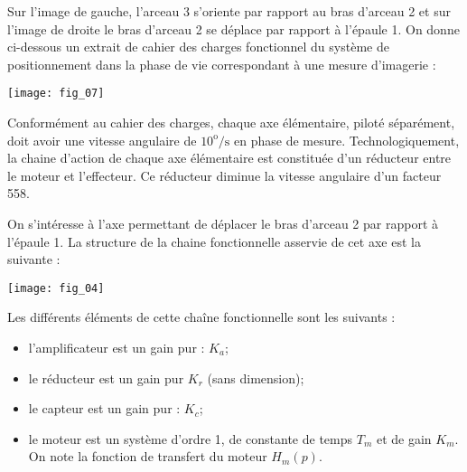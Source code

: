 Sur l’image de gauche, l’arceau 3 s’oriente par rapport au bras d’arceau 2 et sur l’image de droite le bras d’arceau 2 se déplace par rapport à l’épaule 1. On donne ci-dessous un extrait de cahier des charges fonctionnel du système de positionnement dans la phase de vie correspondant à une mesure d'imagerie : 

\begin{center}
\texttt{[image: fig\_07]}
\end{center}

%

Conformément au cahier des charges, chaque axe élémentaire, piloté séparément, doit avoir une vitesse angulaire de $10^{\text{o}}\text{/s}$ en phase de mesure. Technologiquement, la chaine d’action de chaque axe élémentaire est constituée d’un réducteur entre le moteur et l’effecteur. Ce réducteur diminue la vitesse angulaire d'un facteur 558. 


On s’intéresse à l’axe permettant de déplacer le bras d’arceau 2 par rapport à l’épaule 1. La structure de la chaine fonctionnelle asservie de cet axe est la suivante : 
\begin{center}
\texttt{[image: fig\_04]}
\end{center}


Les différents éléments de cette chaîne fonctionnelle sont les suivants :
\begin{itemize}
\item l'amplificateur est un gain pur : $K_a$;
\item le réducteur est un gain pur $K_r$ (sans dimension);
\item le capteur est un gain pur : $K_c$;
\item le moteur est un système d'ordre 1, de constante de temps $T_m$ et de gain $K_m$. On note la fonction de transfert du moteur $H_m (p)$. 
\end{itemize}





